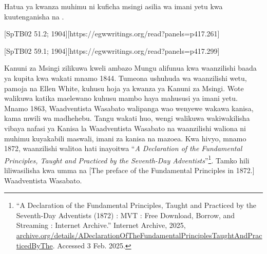 Hatua ya kwanza muhimu ni kuficha msingi asilia wa imani yetu kwa kuutenganisha na .

[SpTB02 51.2; 1904][https://egwwritings.org/read?panels=p417.261]

[SpTB02 59.1; 1904][https://egwwritings.org/read?panels=p417.299]

Kanuni za Msingi zilikuwa kweli ambazo Mungu alifunua kwa waanzilishi baada ya kupita kwa wakati mnamo 1844. Tumeona ushuhuda wa waanzilishi wetu, pamoja na Ellen White, kuhusu hoja ya kwanza ya Kanuni za Msingi. Wote walikuwa katika maelewano kuhusu mambo haya mahususi ya imani yetu. Mnamo 1863, Waadventista Wasabato walipanga wao wenyewe wakawa kanisa, kama mwili wa madhehebu. Tangu wakati huo, wengi walikuwa wakiwakilisha vibaya nafasi ya Kanisa la Waadventista Wasabato na waanzilishi waliona ni muhimu kuyakabili maswali,  imani za kanisa na mazoea. Kwa hivyo, mnamo 1872, waanzilishi walitoa hati inayoitwa “\textit{A Declaration of the Fundamental Principles, Taught and Practiced by the Seventh-Day Adventists}”\footnote{“A Declaration of the Fundamental Principles, Taught and Practiced by the Seventh-Day Adventists (1872) : MVT : Free Download, Borrow, and Streaming : Internet Archive.” Internet Archive, 2025, \href{https://archive.org/details/ADeclarationOfTheFundamentalPrinciplesTaughtAndPracticedByThe}{archive.org/details/ADeclarationOfTheFundamentalPrinciplesTaughtAndPracticedByThe}. Accessed 3 Feb. 2025.}. Tamko hili liliwasilisha kwa umma na [The preface of the Fundamental Principles in 1872.] Waadventista Wasabato.

